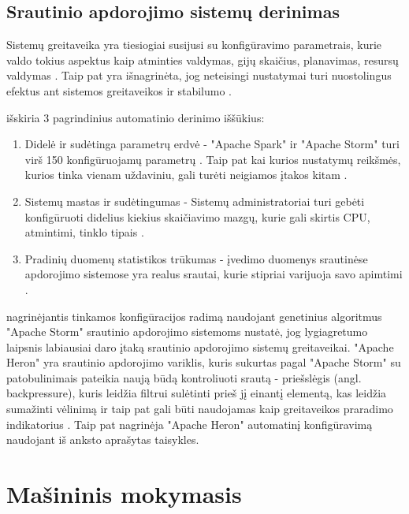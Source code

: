\documentclass{VUMIFPSbakalaurinis}
\begin{document}
\subsection{Srautinio apdorojimo sistemų derinimas}
Sistemų greitaveika yra tiesiogiai susijusi su konfigūravimo parametrais, kurie valdo tokius aspektus kaip atminties valdymas, gijų skaičius, planavimas, resursų valdymas \cite{lu2019speedup}. Taip pat yra išnagrinėta, jog neteisingi nustatymai turi nuostolingus efektus ant sistemos greitaveikos ir stabilumo \cite{herodotou2011starfish}. 

\cite{herodotou2020survey} išskiria 3 pagrindinius automatinio derinimo iššūkius:
\begin{enumerate}
    \item Didelė ir sudėtinga parametrų erdvė - "Apache Spark" ir "Apache Storm" turi virš 150 konfigūruojamų parametrų \cite{Bilal2017Towards, petridis2016spark}. Taip pat kai kurios nustatymų reikšmės, kurios tinka vienam uždaviniu, gali turėti neigiamos įtakos kitam \cite{herodotou2011starfish, Pooyan2016Uncertainty}.
    \item Sistemų mastas ir sudėtingumas - Sistemų administratoriai turi gebėti konfigūruoti didelius kiekius skaičiavimo mazgų, kurie gali skirtis CPU, atmintimi, tinklo tipais \cite{herodotou2020survey}.
    \item Pradinių duomenų statistikos trūkumas - įvedimo duomenys srautinėse apdorojimo sistemose yra realus srautai, kurie stipriai varijuoja savo apimtimi \cite{Dayarathna2018Recent}.
\end{enumerate}  

\cite{Trotter2017Into} nagrinėjantis tinkamos konfigūracijos radimą naudojant genetinius algoritmus "Apache Storm" srautinio apdorojimo sistemoms nustatė, jog lygiagretumo laipsnis labiausiai daro įtaką srautinio apdorojimo sistemų greitaveikai. 
"Apache Heron" yra srautinio apdorojimo variklis, kuris sukurtas pagal "Apache Storm" su patobulinimais \cite{twitterHeron} pateikia naują būdą kontroliuoti srautą - priešslėgis (angl. backpressure), kuris leidžia filtrui sulėtinti prieš jį einantį elementą, kas leidžia sumažinti vėlinimą ir taip pat gali būti naudojamas kaip greitaveikos praradimo indikatorius \cite{bansal2018trevor}.
Taip pat \cite{bansal2018trevor} nagrinėja "Apache Heron" automatinį konfigūravimą naudojant iš anksto aprašytas taisykles. 


\section{Mašininis mokymasis}
\end{document}
